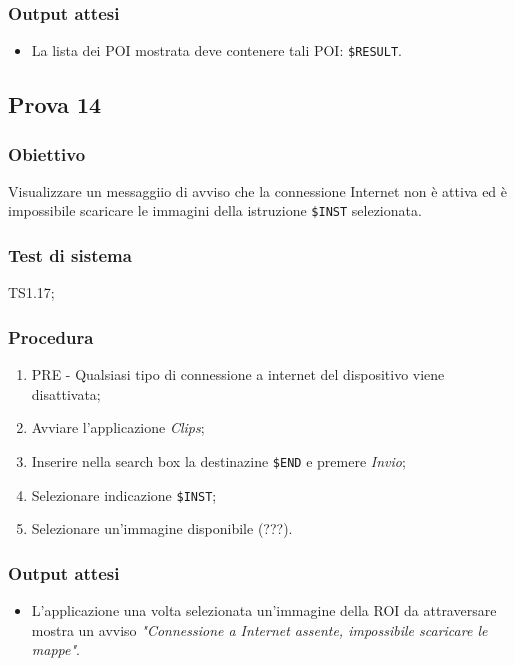 \documentclass[../Sperimentazione.tex]{subfiles}
\begin{document}
	\subsubsection{Output attesi}
		\begin{itemize}
		\item La lista dei POI mostrata deve contenere tali POI: \verb|$RESULT|.
		\end{itemize}
		
	
		
\newpage	
\subsection{Prova 14} %
\label{subsec:Prova14}
	
	\subsubsection{Obiettivo}
		Visualizzare un messaggiio di avviso che la connessione Internet non è attiva ed è impossibile scaricare le immagini della istruzione  \verb|$INST| selezionata.
		
	\subsubsection{Test di sistema}
		TS1.17;
		
	\subsubsection{Procedura}
		\begin{enumerate}
		\item PRE - Qualsiasi tipo di connessione a internet del dispositivo viene disattivata;
		
		\item Avviare l'applicazione \textit{Clips};
		\item Inserire nella search box la destinazine  \verb|$END| e premere \textit{Invio};
		\item Selezionare indicazione  \verb|$INST|;
		\item Selezionare un'immagine disponibile (???).
		\end{enumerate}

	\subsubsection{Output attesi}
		\begin{itemize}
		\item L'applicazione una volta selezionata un'immagine della ROI da attraversare mostra un avviso \textit{"Connessione a Internet assente, impossibile scaricare le mappe"}.
		\end{itemize}
\end{document}
